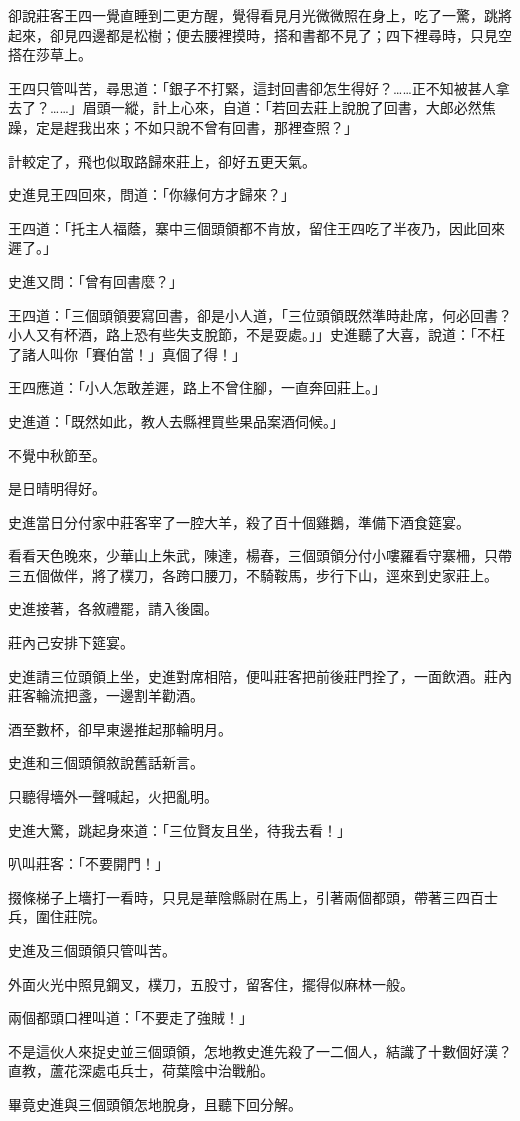 \documentclass[11pt,a4paper]{article}
\begin{document}
卻說莊客王四一覺直睡到二更方醒，覺得看見月光微微照在身上，吃了一驚，跳將起來，卻見四邊都是松樹；便去腰裡摸時，搭和書都不見了；四下裡尋時，只見空搭在莎草上。

王四只管叫苦，尋思道：「銀子不打緊，這封回書卻怎生得好？……正不知被甚人拿去了？……」眉頭一縱，計上心來，自道：「若回去莊上說脫了回書，大郎必然焦躁，定是趕我出來；不如只說不曾有回書，那裡查照？」

計較定了，飛也似取路歸來莊上，卻好五更天氣。

史進見王四回來，問道：「你緣何方才歸來？」

王四道：「托主人福蔭，寨中三個頭領都不肯放，留住王四吃了半夜乃，因此回來遲了。」

史進又問：「曾有回書麼？」

王四道：「三個頭領要寫回書，卻是小人道，「三位頭領既然準時赴席，何必回書？小人又有杯酒，路上恐有些失支脫節，不是耍處。」」史進聽了大喜，說道：「不枉了諸人叫你「賽伯當！」真個了得！」

王四應道：「小人怎敢差遲，路上不曾住腳，一直奔回莊上。」

史進道：「既然如此，教人去縣裡買些果品案酒伺候。」

不覺中秋節至。

是日晴明得好。

史進當日分付家中莊客宰了一腔大羊，殺了百十個雞鵝，準備下酒食筵宴。

看看天色晚來，少華山上朱武，陳達，楊春，三個頭領分付小嘍羅看守寨柵，只帶三五個做伴，將了樸刀，各跨口腰刀，不騎鞍馬，步行下山，逕來到史家莊上。

史進接著，各敘禮罷，請入後園。

莊內己安排下筵宴。

史進請三位頭領上坐，史進對席相陪，便叫莊客把前後莊門拴了，一面飲酒。莊內莊客輪流把盞，一邊割羊勸酒。

酒至數杯，卻早東邊推起那輪明月。

史進和三個頭領敘說舊話新言。

只聽得墻外一聲喊起，火把亂明。

史進大驚，跳起身來道：「三位賢友且坐，待我去看！」

叭叫莊客：「不要開門！」

掇條梯子上墻打一看時，只見是華陰縣尉在馬上，引著兩個都頭，帶著三四百士兵，圍住莊院。

史進及三個頭領只管叫苦。

外面火光中照見鋼叉，樸刀，五股寸，留客住，擺得似麻林一般。

兩個都頭口裡叫道：「不要走了強賊！」

不是這伙人來捉史並三個頭領，怎地教史進先殺了一二個人，結識了十數個好漢？直教，蘆花深處屯兵士，荷葉陰中治戰船。

畢竟史進與三個頭領怎地脫身，且聽下回分解。
\end{document}
